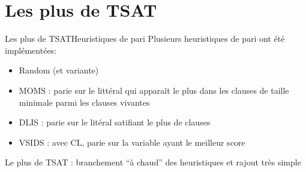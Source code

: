 \documentclass{beamer}
\begin{document}
    \section{Les plus de TSAT}
        \begin{frame}{Les plus de TSAT}{Heuristiques de pari}
            Plusieurs heuristiques de pari ont été implémentées:
            \begin{itemize}
                \item Random (et variante)
                \item MOMS : parie sur le littéral qui apparaît le plus dans les clauses de taille minimale parmi les clauses vivantes
                \item DLIS : parie sur le litéral satifiant le plus de clauses
                \item VSIDS : avec CL, parie sur la variable ayant le meilleur score
            \end{itemize}
            \vspace{0.5cm}
            Le plus de TSAT : branchement ``à chaud'' des heuristiques et rajout très simple
        \end{frame}
\end{document}
